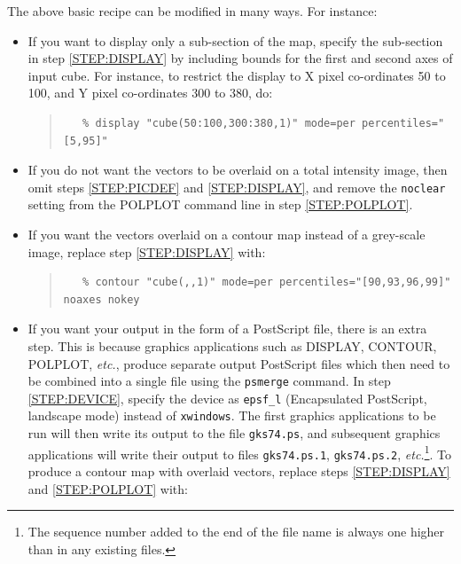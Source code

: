 \documentclass[twoside,11pt]{article}
\newcommand{\xref}[3]{#1}
\renewcommand{\_}{\texttt{\symbol{95}}}
\newenvironment{myquote}{\begin{quote}\begin{small}}{\end{small}\end{quote}}
\begin{document}
The above basic recipe can be modified in many ways. For instance:

\begin{itemize}

\item If you want to display only a sub-section of the map, specify the
sub-section in step \ref{STEP:DISPLAY} by including bounds for the
first and second axes of input cube. For instance, to restrict the
display to X pixel co-ordinates 50 to 100, and Y pixel co-ordinates 300 
to 380, do:

\begin{myquote}
\begin{verbatim}
   % display "cube(50:100,300:380,1)" mode=per percentiles="[5,95]"
\end{verbatim}
\end{myquote}

\item If you do not want the vectors to be overlaid on a total
intensity image, then omit steps \ref{STEP:PICDEF} and
\ref{STEP:DISPLAY}, and remove the \verb+noclear+ setting from the
POLPLOT command line in step \ref{STEP:POLPLOT}.

\item If you want the vectors overlaid on a contour map instead of a
grey-scale image, replace step \ref{STEP:DISPLAY} with:

\begin{myquote}
\begin{verbatim}
   % contour "cube(,,1)" mode=per percentiles="[90,93,96,99]" noaxes nokey
\end{verbatim}
\end{myquote}

\item If you want your output in the form of a PostScript file, there is
an extra step. This is because graphics applications such as DISPLAY,
CONTOUR, POLPLOT, \emph{etc.}, produce separate output PostScript files which
then need to be combined into a single file using the 
\xref{\texttt{psmerge}}{sun164}{} command. In step \ref{STEP:DEVICE},
specify the device as \verb+epsf_l+ (Encapsulated PostScript, landscape
mode) instead of \verb+xwindows+. The first graphics applications to be
run will then write its output to the file \verb+gks74.ps+, and
subsequent graphics applications will write their output to files
\verb+gks74.ps.1+, \verb+gks74.ps.2+, \emph{etc.}\footnote{The sequence number
added to the end of the file name is always one higher than in any
existing files.}. To produce a contour map with overlaid vectors, replace
steps \ref{STEP:DISPLAY} and \ref{STEP:POLPLOT} with:


\end{itemize}
\end{document}
